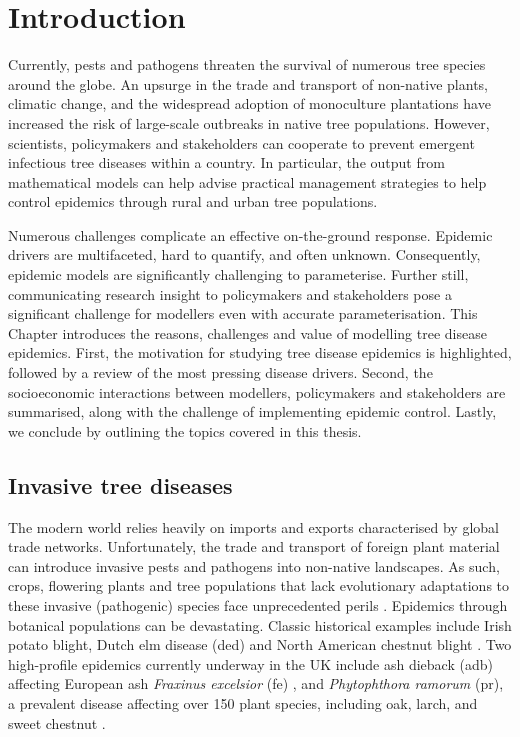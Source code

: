 \chapter{Introduction}

Currently, pests and pathogens threaten the survival of numerous tree species around the globe. 
An upsurge in the trade and transport of non-native plants, climatic change, and the widespread adoption of monoculture plantations have increased the risk of large-scale outbreaks in native tree populations. 
However, scientists, policymakers and stakeholders can cooperate to prevent emergent infectious tree diseases within a country. 
In particular, the output from mathematical models can help advise practical management strategies to help control epidemics through rural and urban tree populations.

Numerous challenges complicate an effective on-the-ground response. Epidemic drivers are multifaceted, hard to quantify, and often unknown. 
Consequently, epidemic models are significantly challenging to parameterise. 
Further still, communicating research insight to policymakers and stakeholders pose a significant challenge for modellers even with accurate parameterisation.
This Chapter introduces the reasons, challenges and value of modelling tree disease epidemics.
First, the motivation for studying tree disease epidemics is highlighted, followed by a review of the most pressing disease drivers.
Second, the socioeconomic interactions between modellers, policymakers and stakeholders are summarised, along with the challenge of implementing epidemic control.
Lastly, we conclude by outlining the topics covered in this thesis.

\newpage

\section{Invasive tree diseases}

The modern world relies heavily on imports and exports characterised by global trade networks. 
Unfortunately, the trade and transport of foreign plant material can introduce invasive pests and pathogens into non-native landscapes. 
As such, crops, flowering plants and tree populations that lack evolutionary adaptations 
to these invasive (pathogenic) species face unprecedented perils \cite{doi:10.1002/9781444329988.ch8}.
Epidemics through botanical populations can be devastating.
Classic historical examples include Irish potato blight, Dutch elm disease (\acrshort{ded}) \cite{doi:10.1111/j.1365-3059.2010.02391.x} 
and North American chestnut blight \cite{doi:10.1002/9780470535486.ch7}.
Two high-profile epidemics currently underway in the UK include ash dieback (\acrshort{adb}) affecting European ash \textit{Fraxinus excelsior} (\acrshort{fe})
\cite{ash-dieback-costs}, and \textit{Phytophthora ramorum} (\acrshort{pr}), a prevalent disease affecting over 150 plant species, including oak, 
larch, and sweet chestnut \cite{p.ramourum}.

